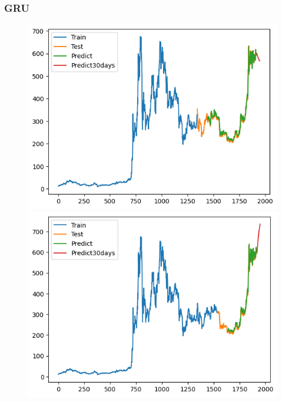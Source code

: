 \documentclass[conference]{IEEEtran}
\begin{document}
\subsubsection{GRU}
	        \begin{figure}[H]
			\centering
			\begin{minipage}{0.15\textwidth}
				\centering
				\includegraphics[width=1\textwidth]{Figure/GRU_BNB_73.png}
			\end{minipage}
			\hfill
			\begin{minipage}{0.15\textwidth}
				\centering
				\includegraphics[width=1\textwidth]{Figure/GRU_BNB_82.png}
			\end{minipage}
			\hfill
			\begin{minipage}{0.15\textwidth}

\end{minipage}
\end{figure}
\end{document}

